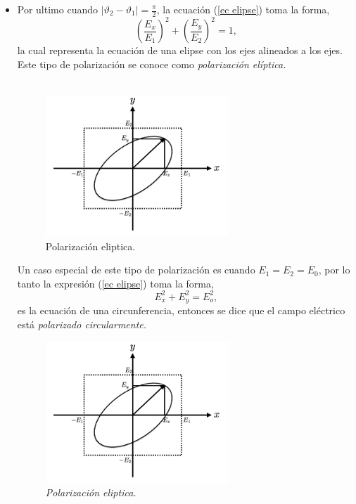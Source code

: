 \documentclass[11pt,fleqn]{book} %
\begin{document}
\begin{itemize}
 \item Por ultimo cuando $|\vartheta_2-\vartheta_1|=\frac{\pi}{2}$, la ecuaci\'on (\ref{ec elipse}) toma la forma,
\begin{equation*}
\left( \frac{E_x}{E_1}\right)^2 + \left(\frac{E_y}{E_2}\right)^2=1,
\end{equation*}
la cual representa la ecuaci\'on de una elipse con los ejes alineados a los ejes. Este tipo de polarizaci\'on se conoce como
\textit{polarizaci\'on el\'iptica.} \\\\

\begin{figure}[h!]
\centering
\includegraphics[width=0.65\textwidth]{Pictures/polarizacioneliptica.png}
\caption{Polarizaci\'on eliptica.}
\end{figure}

Un caso especial de este tipo de polarizaci\'on es cuando $E_1=E_2=E_0$, por lo tanto la expresi\'on (\ref{ec elipse}) toma la forma,
\begin{equation}
 E_x^2+E_y^2=E_o^2,
\end{equation}
es la ecuaci\'on de una circunferencia, entonces se dice que el campo el\'ectrico est\'a \textit{polarizado circularmente.}

\begin{figure}[h!]
\centering
\includegraphics[width=0.65\textwidth]{Pictures/polarizacioneliptica.png}
\caption{\textit{Polarizaci\'on eliptica.}}
\end{figure}
 \end{itemize}
\end{document}
